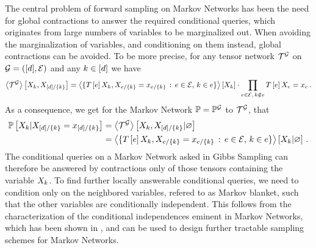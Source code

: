 The central problem of forward sampling on Markov Networks has been the need for global contractions to answer the required conditional queries, which originates from large numbers of variables to be marginalized out.
When avoiding the marginalization of variables, and conditioning on them instead, global contractions can be avoided.
To be more precise, for any tensor network $\mathcal{T}^{\mathcal{G}}$ on $\mathcal{G}=([d],\mathcal{E})$ and any $k\in[d]$ we have
\begin{align*}
    \left\langle \mathcal{T}^{\mathcal{G}}\right\rangle \left[ X_{k},X_{[d]/\{k\}} \right]
    = \left\langle \{T\left[e\right]{X_{k},X_{e/\{k\}}=x_{e/\{k\}}} \, : \, e\in\mathcal{E}, \, k\in e\}\right\rangle \left[ X_{k} \right]
    \cdot \prod_{e\in\mathcal{E}, \, k\notin e} T\left[e\right]{X_{e}=x_{e}} \, .
\end{align*}
As a consequence, we get for the Markov Network $\mathbb{P}=\mathbb{P}^{\mathcal{G}}$ to $\mathcal{T}^{\mathcal{G}}$, that
\begin{align*}
    \mathbb{P}\left[X_{k}|X_{[d]/\{k\}}=x_{[d]/\{k\}}\right]
    &= \left\langle \mathcal{T}^{\mathcal{G}}\right\rangle \left[ X_{k},X_{[d]/\{k\}} | \varnothing \right] \\
    &= \left\langle \{T\left[e\right]{X_{k},X_{e/\{k\}}=x_{e/\{k\}}} \, : \, e\in\mathcal{E}, \, k\in e\}\right\rangle \left[ X_{k} | \varnothing \right] \, .
\end{align*}
The conditional queries on a Markov Network asked in Gibbs Sampling can therefore be answered by contractions only of those tensors containing the variable $X_{k}$.
To find further locally answerable conditional queries, we need to condition only on the neighbored variables, refered to as Markov blanket, such that the other variables are conditionally independent.
This follows from the characterization of the conditional independences eminent in Markov Networks, which has been shown in , and can be used to design further tractable sampling schemes for Markov Networks.

